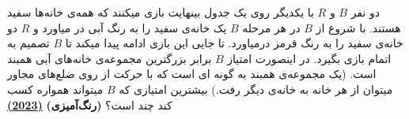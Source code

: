 دو نفر $B$ و $R$ با یکدیگر روی یک جدول بینهایت بازی میکنند که همه‌ی خانه‌ها سفید هستند.
با شروع از $B$ در هر مرحله $B$ یک خانه‌ی سفید را به رنگ آبی در میاورد و $R$ دو خانه‌ی سفید را به رنگ قرمز درمیاورد.
تا جایی این بازی ادامه پیدا میکند تا $B$ تصمیم به اتمام بازی بگیرد. 
در اینصورت امتیاز $B$ برابر بزرگترین مجموعه‌ی خانه‌های آبی همبند است. (یک مجموعه‌ی همبند به گونه ای است که با حرکت از روی ضلع‌های مجاور میتوان از هر خانه به خانه‌ی دیگر رفت.)
بیشترین امتیازی که $B$ میتواند همواره کسب کند چند است؟
\textbf{(رنگ‌آمیزی)}
\href{https://artofproblemsolving.com/community/c5h3038307p27349414}{\textbf{(2023)}}